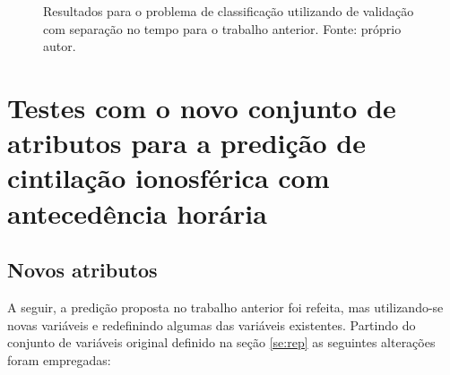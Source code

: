 \begin{figure}[h]
\center
\hspace{-2cm}
\caption{Resultados para o problema de classificação utilizando de validação com separação no tempo para o trabalho anterior. Fonte: próprio autor.}
\label{fig:classomii}
\end{figure}


\section{Testes com o novo conjunto de atributos para a predição de cintilação ionosférica com antecedência horária}\label{sec:new}

\subsection{Novos atributos}\label{sec:v1}

A seguir, a predição proposta no trabalho anterior foi refeita, mas utilizando-se novas variáveis e redefinindo algumas das variáveis existentes. Partindo do conjunto de variáveis original definido na seção \ref{se:rep} as seguintes alterações foram empregadas:

